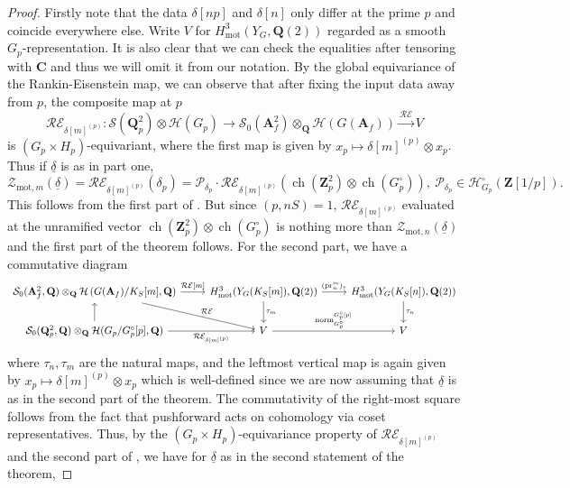 \documentclass{amsart}%
\theoremstyle{plain}
\theoremstyle{plain}
\theoremstyle{remark}
\DeclareMathOperator{\ch}{ch}
\begin{document}
\begin{proof}
    Firstly note that the data $\delta[np]$ and $\delta[n]$ only differ at the prime $p$ and coincide everywhere else. Write $V$ for $H^3_\mathrm{mot}(Y_G,\mathbf{Q}(2))$ regarded as a smooth $G_p$-representation. It is also clear that we can check the equalities after tensoring with $\mathbf{C}$ and thus we will omit it from our notation. By the global equivariance of the Rankin-Eisenstein map, we can observe that after fixing the input data away from $p$, the composite map at $p$
    $$\mathcal{RE}_{\delta[m]^{(p)}}:\mathcal{S}(\mathbf{Q}_p^2)\otimes \mathcal{H}(G_p)\longrightarrow\mathcal{S}_0(\mathbf{A}_f^2)\otimes_\mathbf{Q}\mathcal{H}(G(\mathbf{A}_f))\overset{\mathcal{RE}}{\longrightarrow} V$$
    is $(G_p\times H_p)$-equivariant, where the first map is given by $x_p\mapsto \delta[m]^{(p)}\otimes x_p$. Thus if $\underline{\delta}$ is as in part one,
    $$\mathcal{Z}_{\mathrm{mot},m}\left(\underline{\delta}\right)=\mathcal{RE}_{\delta[m]^{(p)}}(\delta_p)=\mathcal{P}_{\delta_p}\cdot \mathcal{RE}_{\delta[m]^{(p)}}(\ch(\mathbf{Z}_p^2)\otimes \ch(G_p^\circ)),\ \mathcal{P}_{\delta_p}\in\mathcal{H}_{G_p}^\circ(\mathbf{Z}[1/p]).$$ This follows from the first part of . But since $(p,nS)=1$, $\mathcal{RE}_{\delta[m]^{(p)}}$ evaluated at the unramified vector $\ch(\mathbf{Z}_p^2)\otimes \ch(G_p^\circ)$ is nothing more than $\mathcal{Z}_{\mathrm{mot},n}(\underline{\delta})$ and the first part of the theorem follows. For the second part, we have a commutative diagram
    \[\begin{tikzcd}
	{\mathcal{S}_0(\mathbf{A}_f^2,\mathbf{Q})\otimes_\mathbf{Q}\mathcal{H}\left(G(\mathbf{A}_f)/K_S[m],\mathbf{Q}\right)} & {H_\mathrm{mot}^3(Y_G(K_S[m]),\mathbf{Q}(2))} & {H_\mathrm{mot}^3(Y_G(K_S[n]),\mathbf{Q}(2))} \\
	{\mathcal{S}_0(\mathbf{Q}_p^2,\mathbf{Q})\otimes_{\mathbf{Q}} \mathcal{H}(G_p/G_p^\circ[p],\mathbf{Q})} & V & V
	\arrow["{\mathcal{RE}[m]}", from=1-1, to=1-2]
	\arrow["{\mathcal{RE}}", from=1-1, to=2-2]
	\arrow["{(\mathrm{pr}^{m}_n)_*}", from=1-2, to=1-3]
	\arrow["{\tau_{m}}", from=1-2, to=2-2]
	\arrow["{\tau_n}", from=1-3, to=2-3]
	\arrow[from=2-1, to=1-1]
	\arrow["{\mathcal{RE}_{\delta[m]^{(p)}}}"', from=2-1, to=2-2]
	\arrow["{\mathrm{norm}_{G_p^\circ}^{G_p^\circ[p]}}", from=2-2, to=2-3]
\end{tikzcd}\]
where $\tau_{n},\tau_{m}$ are the natural maps, and the leftmost vertical map is again given by $x_p\mapsto \delta[m]^{(p)}\otimes x_p$ which is well-defined since we are now assuming that $\underline{\delta}$ is as in the second part of the theorem. The commutativity of the right-most square follows from the fact that pushforward acts on cohomology via coset representatives. Thus, by the $(G_p\times H_p)$-equivariance property of $\mathcal{RE}_{\delta[m]^{(p)}}$ and the second part of , we have for $\underline{\delta}$ as in the second statement of the theorem,

\end{proof}
\end{document}
